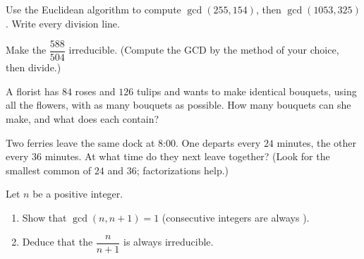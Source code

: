 \begin{exercise}[$\star\star$]\label{exo:g9:arith:6}
Use the Euclidean algorithm to compute $\gcd(255, 154)$, then
$\gcd(1053, 325)$. Write every division line.
\end{exercise}

\begin{exercise}[$\star\star$]\label{exo:g9:arith:7}
Make the  $\dfrac{588}{504}$ irreducible. (Compute the GCD by the
method of your choice, then divide.)
\end{exercise}

\begin{exercise}[$\star\star$]\label{exo:g9:arith:8}
A florist has $84$ roses and $126$ tulips and wants to make identical
bouquets, using all the flowers, with as many bouquets as possible.
How many bouquets can she make, and what does each contain?
\end{exercise}

\begin{exercise}[$\star\star$]\label{exo:g9:arith:9}
Two ferries leave the same dock at 8:00. One departs every $24$ minutes,
the other every $36$ minutes. At what time do they next leave together?
(Look for the smallest common  of $24$ and $36$; factorizations
help.)
\end{exercise}

\begin{exercise}[$\star\star\star$]\label{exo:g9:arith:10}
Let $n$ be a positive integer.
\begin{enumerate}
  \item Show that $\gcd(n, n+1) = 1$ (consecutive integers are always
        ).
  \item Deduce that the  $\dfrac{n}{n+1}$ is always irreducible.
\end{enumerate}
\end{exercise}
